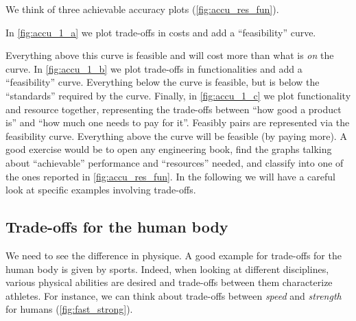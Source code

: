 We think of three achievable accuracy plots (\cref{fig:accu_res_fun}).

In \cref{fig:accu_1_a} we plot trade-offs in costs and add a ``feasibility'' curve.

\begin{figure*}[b]
    \centering
    \caption{}
    \label{fig:accu_res_fun}
\end{figure*}

Everything above this curve is feasible and will cost more than what is \emph{on} the curve.
In \cref{fig:accu_1_b} we plot trade-offs in functionalities and add a ``feasibility'' curve.
Everything below the curve is feasible, but is below the ``standards'' required by the curve.
Finally, in \cref{fig:accu_1_c} we plot functionality and resource together, representing the trade-offs between ``how good a product is'' and ``how much one needs to pay for it''.
Feasibly pairs are represented via the feasibility curve.
Everything above the curve will be feasible (by paying more).
A good exercise would be to open any engineering book, find the graphs talking about ``achievable'' performance and ``resources'' needed, and classify into one of the ones reported in \cref{fig:accu_res_fun}.
In the following we will have a careful look at specific examples involving trade-offs.

\vfill
\clearpage

\subsection{Trade-offs for the human body}

We need to see the difference in physique.
A good example for trade-offs for the human body is given by sports.
Indeed, when looking at different disciplines, various physical abilities are desired and trade-offs between them characterize athletes.
For instance, we can think about trade-offs between \emph{speed} and \emph{strength} for humans (\cref{fig:fast_strong}).

